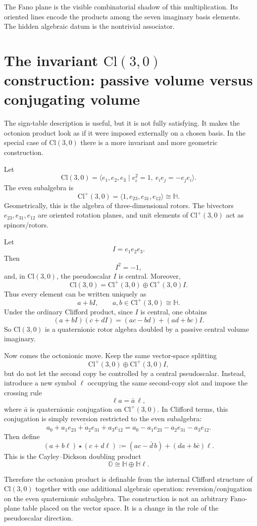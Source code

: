 \documentclass[11pt]{article}
\newcommand{\Cl}{\mathrm{Cl}}
\begin{document}
The Fano plane is the visible combinatorial shadow of this multiplication.
Its oriented lines encode the products among the seven imaginary basis
elements. The hidden algebraic datum is the nontrivial associator.


\section{The invariant $\Cl(3,0)$ construction: passive volume versus conjugating volume}

The sign-table description is useful, but it is not fully satisfying. It
makes the octonion product look as if it were imposed externally on a chosen
basis. In the special case of $\Cl(3,0)$ there is a more invariant and more
geometric construction.

Let
\[
\Cl(3,0)=\langle e_1,e_2,e_3\mid e_i^2=1,\ e_i e_j=-e_j e_i\rangle.
\]
The even subalgebra is
\[
\Cl^+(3,0)=\langle 1,e_{23},e_{31},e_{12}\rangle \cong \mathbb H.
\]
Geometrically, this is the algebra of three-dimensional rotors. The bivectors
$e_{23},e_{31},e_{12}$ are oriented rotation planes, and unit elements of
$\Cl^+(3,0)$ act as spinors/rotors.

Let
\[
I=e_1e_2e_3.
\]
Then
\[
I^2=-1,
\]
and, in $\Cl(3,0)$, the pseudoscalar $I$ is central. Moreover,
\[
\Cl(3,0)=\Cl^+(3,0)\oplus \Cl^+(3,0)I.
\]
Thus every element can be written uniquely as
\[
a+bI,
\qquad a,b\in \Cl^+(3,0)\cong\mathbb H.
\]
Under the ordinary Clifford product, since $I$ is central, one obtains
\[
(a+bI)(c+dI)=(ac-bd)+(ad+bc)I.
\]
So $\Cl(3,0)$ is a quaternionic rotor algebra doubled by a passive central
volume imaginary.

Now comes the octonionic move. Keep the same vector-space splitting
\[
\Cl^+(3,0)\oplus \Cl^+(3,0)I,
\]
but do not let the second copy be controlled by a central pseudoscalar.
Instead, introduce a new symbol $\ell$ occupying the same second-copy slot and
impose the crossing rule
\[
\ell a=\bar a\,\ell,
\]
where $\bar a$ is quaternionic conjugation on $\Cl^+(3,0)$. In Clifford terms,
this conjugation is simply reversion restricted to the even subalgebra:
\[
\overline{a_0+a_1e_{23}+a_2e_{31}+a_3e_{12}}
=
 a_0-a_1e_{23}-a_2e_{31}-a_3e_{12}.
\]
Then define
\[
(a+b\ell)\star(c+d\ell)
:=
(ac-\bar d\,b)+(da+b\bar c)\ell.
\]
This is the Cayley--Dickson doubling product
\[
\mathbb O\cong \mathbb H\oplus \mathbb H\ell.
\]

Therefore the octonion product is definable from the internal Clifford
structure of $\Cl(3,0)$ together with one additional algebraic operation:
reversion/conjugation on the even quaternionic subalgebra. The construction is
not an arbitrary Fano-plane table placed on the vector space. It is a change in
the role of the pseudoscalar direction.
\end{document}
